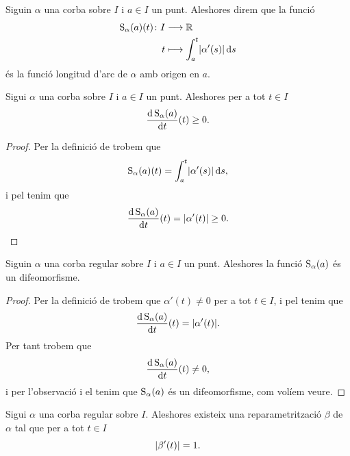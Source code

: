 \documentclass[../Apunts.tex]{subfiles}
\begin{document}
	\begin{definition}
		\label{def:funció longitud d'arc}
		Siguin \(\alpha\) una corba sobre \(I\) i \(a\in I\) un punt. Aleshores direm que la funció
		\begin{align*}
			\funciolongituddarc_{\alpha}(a)(t)\colon I&\longrightarrow\mathbb{R}\\
			t&\longmapsto\int_{a}^{t}\norm{\alpha'(s)}\diff s
		\end{align*}
		és la funció longitud d'arc de \(\alpha\) amb origen en \(a\).
	\end{definition}
	\begin{observation}
		\label{obs:la funció longitud d'arc és creixent}
		Sigui \(\alpha\) una corba sobre \(I\) i \(a\in I\) un punt. Aleshores per a tot \(t\in I\)
		\[\frac{\mathop{}\!\mathrm{d}\operatorname{S}_{\alpha}(a)}{\mathop{}\!\mathrm{d} t}(t)\geq0.\]
	\end{observation}
	\begin{proof}
		Per la definició de  trobem que
		\[\funciolongituddarc_{\alpha}(a)(t)=\int_{a}^{t}\norm{\alpha'(s)}\diff s,\]
		i pel  tenim que
		\[\frac{\diff\funciolongituddarc_{\alpha}(a)}{\diff t}(t)=\norm{\alpha'(t)}\geq0.\qedhere\] %
	\end{proof}
	\begin{proposition}
		\label{prop:la funció longitud arc d'una corba regular és un difeomorfisme}
		Siguin \(\alpha\) una corba regular sobre \(I\) i \(a\in I\) un punt. Aleshores la funció \(\operatorname{S}_{\alpha}(a)\) és un difeomorfisme. %
	\end{proposition}
	\begin{proof}
		Per la definició de  trobem que \(\alpha'(t)\neq0\) per a tot \(t\in I\), i pel  tenim que
		\[\frac{\diff\funciolongituddarc_{\alpha}(a)}{\diff t}(t)=\norm{\alpha'(t)}.\]
		Per tant trobem que %
		\[\frac{\mathop{}\!\mathrm{d}\operatorname{S}_{\alpha}(a)}{\mathop{}\!\mathrm{d} t}(t)\neq0,\]
		i per l'observació  i el \corollari{}  tenim que \(\operatorname{S}_{\alpha}(a)\) és un difeomorfisme, com volíem veure. %
	\end{proof}
	\begin{proposition} %
		\label{prop:podem trobar una reparametrització amb velocitat unitaria de qualsevol corba regular}
		Sigui \(\alpha\) una corba regular sobre \(I\). Aleshores existeix una reparametrització \(\beta\) de \(\alpha\) tal que per a tot \(t\in I\)
		\[\norm{\beta'(t)}=1.\]
	\end{proposition}
\end{document}
